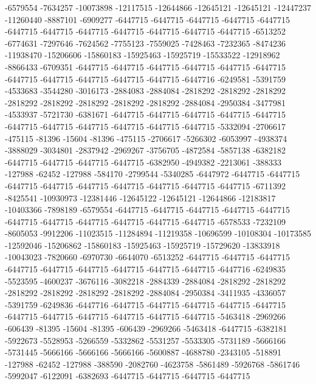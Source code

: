 -6579554 -7634257 -10073898 -12117515 -12644866 -12645121 -12645121 -12447237 -11260440 -8887101 -6909277 -6447715 -6447715 -6447715 -6447715 -6447715 -6447715 -6447715 -6447715 -6447715 -6447715 -6447715 -6447715 -6513252 -6774631 -7297646 -7624562 -7755123 -7559025 -7428463 -7232365 -8474236 -11938470 -15206606 -15860183 -15925463 -15925719 -15533522 -12918962 -8866433 -6709351 -6447715 -6447715 -6447715 -6447715 -6447715 -6447715 -6447715 -6447715 -6447715 -6447715 -6447715 -6447716 -6249581 -5391759 -4533683 -3544280 -3016173 -2884083 -2884084 -2818292 -2818292 -2818292 -2818292 -2818292 -2818292 -2818292 -2818292 -2884084 -2950384 -3477981 -4533937 -5721730 -6381671 -6447715 -6447715 -6447715 -6447715 -6447715 -6447715 -6447715 -6447715 -6447715 -6447715 -6447715 -5332094 -2706617 -475115 -81396 -15604 -81396 -475115 -2706617 -5266302 -6053997 -4938374 -3888029 -3034801 -2837942 -2969267 -3756705 -4872584 -5857138 -6382182 -6447715 -6447715 -6447715 -6447715 -6382950 -4949382 -2213061 -388333 -127988 -62452 -127988 -584170 -2799544 -5340285 -6447972 -6447715 -6447715 -6447715 -6447715 -6447715 -6447715 -6447715 -6447715 -6447715
-6711392 -8425541 -10930973 -12381446 -12645122 -12645121 -12644866 -12183817 -10403366 -7898189 -6579554 -6447715 -6447715 -6447715 -6447715 -6447715 -6447715 -6447715 -6447715 -6447715 -6447715 -6447715 -6578533 -7232109 -8605053 -9912206 -11023515 -11284894 -11219358 -10696599 -10108304 -10173585 -12592046 -15206862 -15860183 -15925463 -15925719 -15729620 -13833918 -10043023 -7820660 -6970730 -6644070 -6513252 -6447715 -6447715 -6447715 -6447715 -6447715 -6447715 -6447715 -6447715 -6447715 -6447716 -6249835 -5523595 -4600237 -3676116 -3082218 -2884339 -2884084 -2818292 -2818292 -2818292 -2818292 -2818292 -2818292 -2884084 -2950384 -3411935 -4336057 -5391759 -6249836 -6447716 -6447715 -6447715 -6447715 -6447715 -6447715 -6447715 -6447715 -6447715 -6447715 -6447715 -6447715 -5463418 -2969266 -606439 -81395 -15604 -81395 -606439 -2969266 -5463418 -6447715 -6382181 -5922673 -5528953 -5266559 -5332862 -5531257 -5533305 -5731189 -5666166 -5731445 -5666166 -5666166 -5666166 -5600887 -4688780 -2343105 -518891 -127988 -62452 -127988 -388590 -2082760 -4623758 -5861489 -5926768 -5861746 -5992047 -6122091 -6382693 -6447715 -6447715 -6447715 -6447715

